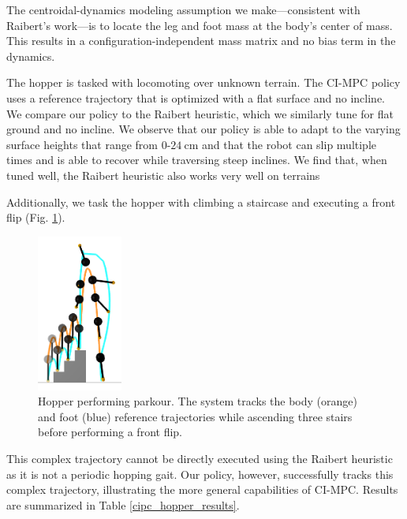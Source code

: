 The centroidal-dynamics modeling assumption we make---consistent with Raibert's work---is to locate the leg and foot mass at the body's center of mass. This results in a configuration-independent mass matrix and no bias term in the dynamics. 

The hopper is tasked with locomoting over unknown terrain. The CI-MPC policy uses a reference trajectory that is optimized with a flat surface and no incline. We compare our policy to the Raibert heuristic, which we similarly tune for flat ground and no incline. We observe that our policy is able to adapt to the varying surface heights that range from $0\mbox{-}24\:$cm and that the robot can slip multiple times and is able to recover while traversing steep inclines. We find that, when tuned well, the Raibert heuristic also works very well on terrains

Additionally, we task the hopper with climbing a staircase and executing a front flip (Fig. \ref{cipc_hopper_parkour}). 

\begin{figure}[H]
	\begin{center}
		\includegraphics[width=0.25\textwidth]{ci_pc/hopper_parkour_v1.png}
	\end{center}
	\caption[Hopper parkour]{Hopper performing parkour. The system tracks the body (orange) and foot (blue) reference trajectories while ascending three stairs before performing a front flip.}
	\label{cipc_hopper_parkour}
\end{figure}

This complex trajectory cannot be directly executed using the Raibert heuristic as it is not a periodic hopping gait. Our policy, however, successfully tracks this complex trajectory, illustrating the more general capabilities of CI-MPC. Results are summarized in Table \ref{cipc_hopper_results}. 

